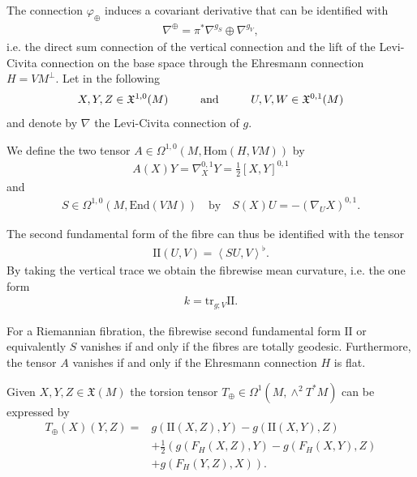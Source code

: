 \documentclass[psamsfonts]{amsart}
\theoremstyle{plain}
\theoremstyle{definition}{
\newtheorem{defi}{Definition}[section]
\newtheorem{ass}{Assumption}
\newtheorem*{nota}{Notation}}
\theoremstyle{remark}{
\newtheorem{rem}{Remark}
\newtheorem{ex}{Example}}
\theoremstyle{plain}{
\newtheorem{thm}{Theorem}[section]
\newtheorem{lem}{Lemma}[section]
\newtheorem{cor}{Corollary}[section]
\newtheorem{prop}{Proposition}[section]
\newtheorem{con}{Conjecture}[section]}
\newcommand{\m}[1]{{\mathrm{#1}}}
\newcommand{\und}[1]{\hspace{#1}\text{and}\hspace{#1}}
\begin{document}
The connection $\varphi_{\oplus}$ induces a covariant derivative that can be identified with
\begin{align*}
    \nabla^{\oplus}=\pi^*\nabla^{g_S}\oplus\nabla^{g_{V}},
\end{align*}
i.e. the direct sum connection of the vertical connection and the lift of the Levi-Civita connection on the base space through the Ehresmann connection $H=VM^\perp$. Let in the following 
\begin{align*}
    X,Y,Z\in\mathfrak{X}^{1,0}(M)\und{1.0cm}U,V,W\in\mathfrak{X}^{0,1}(M)
\end{align*}
and denote by $\nabla$ the Levi-Civita connection of $g$.

\begin{defi}
We define the two tensor $A\in\Omega^{1,0}(M,\m{Hom}(H,VM))$ by
\begin{align*}
    A(X)Y=\nabla^{0,1}_XY=\frac{1}{2}[X,Y]^{0,1}
\end{align*}
and
    \begin{align*}
    S\in\Omega^{1,0}(M,\m{End}(VM)) \quad \text{by} \quad S(X)U=-(\nabla_UX)^{0,1}.
\end{align*}

\end{defi}

The second fundamental form of the fibre can thus be identified with the tensor
\begin{align*}
    \m{II}(U,V)=\left<S U,V\right>^\flat.
\end{align*}
By taking the vertical trace we obtain the fibrewise mean curvature, i.e. the one form 
\begin{align*}
    k=\m{tr}_{g;V}\m{II}.
\end{align*}

\begin{rem}
For a Riemannian fibration, the fibrewise second fundamental form $\m{II}$ or equivalently $S$ vanishes if and only if the fibres are totally geodesic. Furthermore, the tensor $A$ vanishes if and only if the Ehresmann connection $H$ is flat.
\end{rem}



\begin{prop}\cite[Prop. 10.6]{berline1992heat}
Given $X,Y,Z\in\mathfrak{X}(M)$ the torsion tensor $T_{\oplus}\in\Omega^1(M,\wedge^2T^* M)$ can be expressed by 
\begin{align*}
    T_{\oplus}(X)(Y,Z)=&g(\m{II}(X,Z),Y)-g(\m{II}(X,Y),Z)\\
    &+\tfrac{1}{2}\left(g(F_{H}(X,Z),Y)-g(F_{H}(X,Y),Z)\right.\\
    &+\left.g(F_{H}(Y,Z),X)\right).
\end{align*}
\end{prop}
\end{document}

